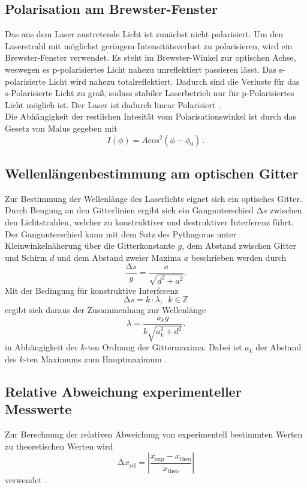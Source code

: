\subsection{Polarisation am Brewster-Fenster}
Das aus dem Laser austretende Licht ist zunächst nicht polarisiert.
Um den Laserstrahl mit möglichst geringem Intensitätsverlust zu polarisieren, wird ein Brewster-Fenster verwendet.
Es steht im Brewster-Winkel zur optischen Achse, weswegen es p-polarisiertes Licht nahezu unreflektiert passieren lässt.
Das s-polarisierte Licht wird nahezu totalreflektiert.
Dadurch sind die Verluste für das s-Polarisierte Licht zu groß, sodass stabiler Laserbetrieb nur für p-Polarisiertes Licht möglich ist.
Der Laser ist dadurch linear Polarisiert \cite{spektrum_brewster}. \\
Die Abhängigkeit der restlichen Intesität vom Polarisationswinkel ist durch das Gesetz von Malus \cite{leifi_malus} gegeben mit
\begin{equation}
    I\left(\phi\right)= A \mathrm{cos}^2\left(\phi - \phi_0\right) \, . 
    \label{eqn:pol}
\end{equation}
% 
\subsection{Wellenlängenbestimmung am optischen Gitter}
Zur Bestimmung der Wellenlänge des Laserlichts eignet sich ein optisches Gitter. 
Durch Beugung an den Gitterlinien ergibt sich ein Gangunterschied $\increment s$ zwischen den Lichtstrahlen, welcher zu konstruktiver und destruktiver Interferenz führt.
Der Gangunterschied kann mit dem Satz des Pythagoras unter Kleinwinkelnäherung über die Gitterkonstante $g$, dem Abstand zwischen Gitter und Schirm $d$ und dem Abstand zweier Maxima $a$ beschrieben werden durch
\begin{equation*}
    \frac{\increment s}{g} = \frac{a}{\sqrt{d^2+a^2}}.
\end{equation*}
Mit der Bedingung für konstruktive Interferenz
\begin{equation*}
    \increment s = k\cdot \lambda,\,\,\, k\in\mathbb{Z}
\end{equation*}
ergibt sich daraus der Zusammenhang zur Wellenlänge
\begin{equation}
    \lambda = \frac{a_{k} g }{k \sqrt{a_{k}^2 + d^2}}.
    \label{eqn:wellenlaenge}
\end{equation}
in Abhängigkeit der $k$-ten Ordnung der Gittermaxima. 
Dabei ist $a_k$ der Abstand des $k$-ten Maximums zum Hauptmaximum \cite{leifi_v61}.
% 
% 
% 
\subsection{Relative Abweichung experimenteller Messwerte}
Zur Berechnung der relativen Abweichung von experimentell bestimmten Werten zu theoretischen Werten wird 
\begin{equation}
    \increment x_{\mathrm{rel}} = \left| \frac{x_{\mathrm{exp}}-x_{\mathrm{theo}}}{x_{\mathrm{theo}}}\right|
    \label{eqn:relabw}
\end{equation}
verwendet \cite{relabw}. 

